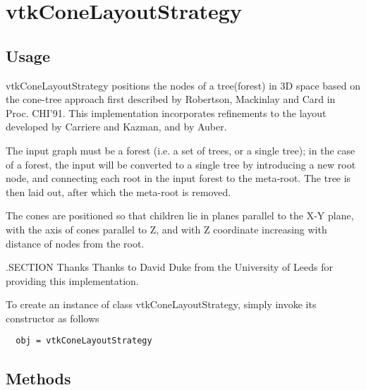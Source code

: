 \section{vtkConeLayoutStrategy}

\subsection{Usage}

 vtkConeLayoutStrategy positions the nodes of a tree(forest) in 3D 
 space based on the cone-tree approach first described by 
 Robertson, Mackinlay and Card in Proc. CHI'91.  This
 implementation incorporates refinements to the layout 
 developed by Carriere and Kazman, and by Auber.

 The input graph must be a forest (i.e. a set of trees, or a 
 single tree); in the case of a forest, the input will be
 converted to a single tree by introducing a new root node, 
 and connecting each root in the input forest to the meta-root. 
 The tree is then laid out, after which the meta-root is removed.  

 The cones are positioned so that children lie in planes parallel
 to the X-Y plane, with the axis of cones parallel to Z, and
 with Z coordinate increasing with distance of nodes from the root.

 .SECTION Thanks
 Thanks to David Duke from the University of Leeds for providing this 
 implementation.

To create an instance of class vtkConeLayoutStrategy, simply
invoke its constructor as follows
\begin{verbatim}
  obj = vtkConeLayoutStrategy
\end{verbatim}
\subsection{Methods}

